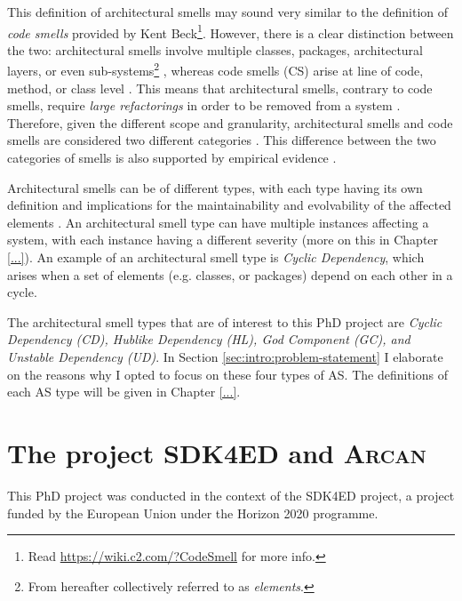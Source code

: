 This definition of architectural smells may sound very similar to the definition of \emph{code smells} provided by Kent Beck\footnote{Read \url{https://wiki.c2.com/?CodeSmell} for more info.}. 
However, there is a clear distinction between the two: architectural smells involve multiple classes, packages, architectural layers, or even sub-systems\footnote{From hereafter collectively referred to as \emph{elements}.} \cite{Lippert2006}, whereas code smells (CS) arise at line of code, method, or class level \cite{Fowler2002}. 
This means that architectural smells, contrary to code smells, require \emph{large refactorings} in order to be removed from a system \cite{Lippert2006}.
Therefore, given the different scope and granularity, architectural smells and code smells are considered two different categories \cite{Sharma2020}.
This difference between the two categories of smells is also supported by empirical evidence \cite{Arcelli2019}.

Architectural smells can be of different types, with each type having its own definition and implications for the maintainability and evolvability of the affected elements \cite{Azadi2019}.
An architectural smell type can have multiple instances affecting a system, with each instance having a different severity (more on this in Chapter \ref{...}).
An example of an architectural smell type is \emph{Cyclic Dependency}, which arises when a set of elements (e.g. classes, or packages) depend on each other in a cycle.

The architectural smell types that are of interest to this PhD project are \emph{Cyclic Dependency (CD), Hublike Dependency (HL), God Component (GC), and Unstable Dependency (UD)}.
In Section \ref{sec:intro:problem-statement} I elaborate on the reasons why I opted to focus on these four types of AS.
The definitions of each AS type will be given in Chapter \ref{...}.


\section{The project SDK4ED and \textsc{Arcan}}
This PhD project was conducted in the context of the SDK4ED project, a project funded by the European Union under the Horizon 2020 programme.

